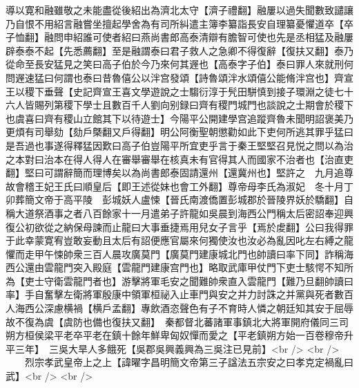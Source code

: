 導以寛和融雖敬之未能盡從後紹出為濟北太守【濟子禮翻】融屢以過失聞數致譴讓乃自恨不用紹言融嘗坐擅起學舍為有司所糾遣主簿李纂詣長安自理纂憂懼道卒【卒子恤翻】融問申紹誰可使者紹曰燕尚書郎高泰清辯有膽智可使也先是丞相猛及融屢辟泰泰不起【先悉薦翻】至是融謂泰曰君子救人之急卿不得復辭【復扶又翻】泰乃從命至長安猛見之笑曰高子伯於今乃來何其遟也【高泰字子伯】泰曰罪人來就刑何問遟速猛曰何謂也泰曰昔魯僖公以泮宫發頌【詩魯頌泮水頌僖公能脩泮宫也】齊宣王以稷下垂聲【史記齊宣王喜文學遊說之士騶衍淳于髠田駢慎到接子環淵之徒七十六人皆賜列第稷下學士且數百千人劉向别録曰齊有稷門城門也談說之士期會於稷下也虞喜曰齊有稷山立館其下以待遊士】今陽平公開建學宫追蹤齊魯未聞明詔褒美乃更煩有司舉劾【劾戶槩翻又戶得翻】明公阿衡聖朝懲勸如此下吏何所逃其罪乎猛曰是吾過也事遂得釋猛因歎曰高子伯豈陽平所宜吏乎言于秦王堅堅召見悦之問以為治之本對曰治本在得人得人在審舉審舉在核真未有官得其人而國家不治者也【治直吏翻】堅曰可謂辭簡而理博矣以為尚書郎泰固請還州【還冀州也】堅許之　九月追尊故會稽王妃王氏曰順皇后【即王述從妹也會工外翻】尊帝母李氏為淑妃　冬十月丁卯葬簡文帝于高平陵　彭城妖人盧悚【晉氏南渡僑置彭城郡於晉陵界妖於驕翻】自稱大道祭酒事之者八百餘家十一月遣弟子許龍如吳晨到海西公門稱太后密詔奉迎興復公初欲從之納保母諫而止龍曰大事垂捷焉用兒女子言乎【焉於䖍翻】公曰我得罪于此幸蒙寛宥豈敢妄動且太后有詔便應官屬來何獨使汝也汝必為亂因叱左右縛之龍懼而走甲午悚帥衆三百人晨攻廣莫門【廣莫門建康城北門也帥讀曰率下同】詐稱海西公還由雲龍門突入殿庭【雲龍門建康宫門也】略取武庫甲仗門下吏士駭愕不知所為【吏士守衛雲龍門者也】游擊將軍毛安之聞難帥衆直入雲龍門【難乃旦翻帥讀曰率】手自奮擊左衛將軍殷康中領軍桓祕入止車門與安之并力討誅之并黨與死者數百人海西公深慮横禍【横戶孟翻】專飲酒恣聲色有子不育時人憐之朝廷知其安于屈辱故不復為虞【虞防也備也復扶又翻】　秦都督北蕃諸軍事鎮北大將軍開府儀同三司朔方桓侯梁平老卒平老在鎮十餘年鮮卑匈奴憚而愛之【平老鎮朔方始一百卷穆帝升平三年】　三吳大旱人多餓死【吳郡吳興義興為三吳注已見前】<br />
<br />
　　烈宗孝武皇帝上之上【諱曜字昌明簡文帝第三子諡法五宗安之曰孝克定禍亂曰武】<br />
<br />
